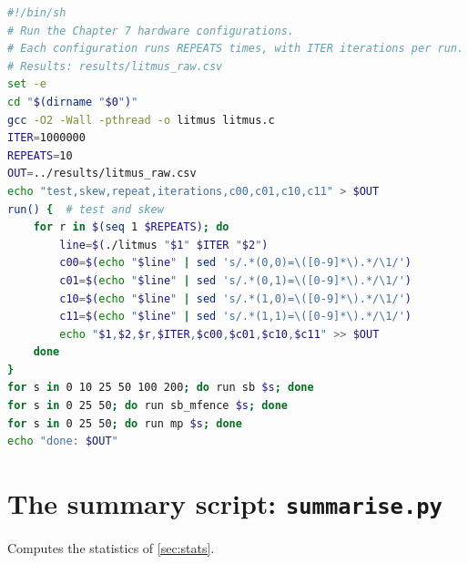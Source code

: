\begin{lstlisting}[style=vscode,language=bash]
#!/bin/sh
# Run the Chapter 7 hardware configurations.
# Each configuration runs REPEATS times, with ITER iterations per run.
# Results: results/litmus_raw.csv
set -e
cd "$(dirname "$0")"
gcc -O2 -Wall -pthread -o litmus litmus.c
ITER=1000000
REPEATS=10
OUT=../results/litmus_raw.csv
echo "test,skew,repeat,iterations,c00,c01,c10,c11" > $OUT
run() {  # test and skew
    for r in $(seq 1 $REPEATS); do
        line=$(./litmus "$1" $ITER "$2")
        c00=$(echo "$line" | sed 's/.*(0,0)=\([0-9]*\).*/\1/')
        c01=$(echo "$line" | sed 's/.*(0,1)=\([0-9]*\).*/\1/')
        c10=$(echo "$line" | sed 's/.*(1,0)=\([0-9]*\).*/\1/')
        c11=$(echo "$line" | sed 's/.*(1,1)=\([0-9]*\).*/\1/')
        echo "$1,$2,$r,$ITER,$c00,$c01,$c10,$c11" >> $OUT
    done
}
for s in 0 10 25 50 100 200; do run sb $s; done
for s in 0 25 50; do run sb_mfence $s; done
for s in 0 25 50; do run mp $s; done
echo "done: $OUT"
\end{lstlisting}

\section{The summary script: \texttt{summarise.py}}
Computes the statistics of \cref{sec:stats}.

